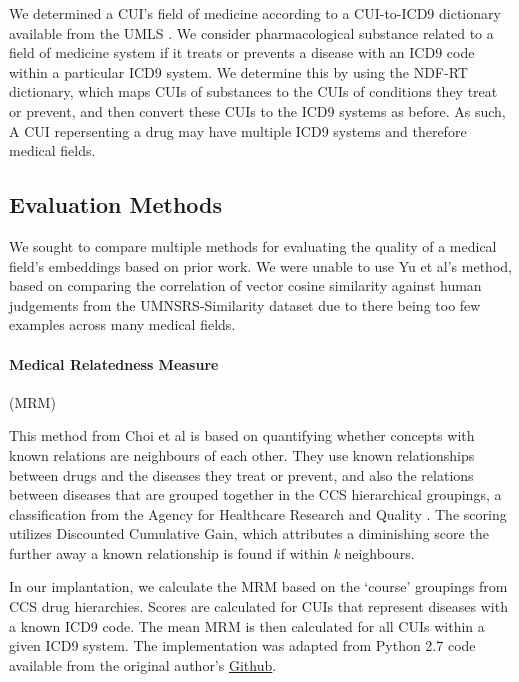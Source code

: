 \documentclass[11pt,a4paper]{article}
\begin{document}
We determined a CUI's field of medicine according to a CUI-to-ICD9 dictionary available from the UMLS \cite{bodenreiderUnifiedMedicalLanguage2004}. We consider pharmacological substance related to a field of medicine system if it treats or prevents a disease with an ICD9 code within a particular ICD9 system. We determine this by using the NDF-RT dictionary, which maps CUIs of substances to the CUIs of conditions they treat or prevent, and then convert these CUIs to the ICD9 systems as before.  As such, A CUI repersenting a drug may have multiple ICD9 systems and therefore medical fields. 

\subsection{Evaluation Methods}

We sought to compare multiple methods for evaluating the quality of a medical field's embeddings based on prior work. We were unable to use Yu et al's  method, based on comparing the correlation of vector cosine similarity against human judgements from the UMNSRS-Similarity dataset \cite{pakhomovSemanticRelatednessSimilarity2018} due to there being too few examples across many medical fields. 

\paragraph{Medical Relatedness Measure}(MRM)

This method from Choi et al  is based on quantifying whether concepts with known relations are neighbours of each other.  They use known relationships between drugs and the diseases they treat or prevent, and also the relations between diseases that are grouped together in the CCS hierarchical groupings, a classification from the Agency for Healthcare Research and Quality \cite{ClinicalClassificationsSoftware}. The scoring utilizes Discounted Cumulative Gain, which attributes a diminishing score the further away a known relationship is found if within \emph{k} neighbours. 

In our implantation, we calculate the MRM based on the `course' groupings from CCS drug hierarchies. Scores are calculated for CUIs that represent diseases with a known ICD9 code. The mean MRM is then calculated for all CUIs within a given ICD9 system. The implementation was adapted from Python 2.7 code available from the original author's \href{https://github.com/clinicalml/embeddings}{Github}.
\end{document}
